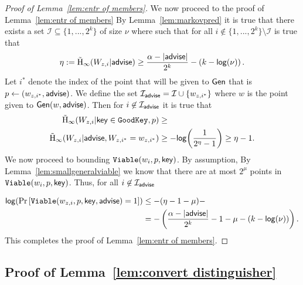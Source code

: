 \begin{proof}[Proof of Lemma~\ref{lem:entr of members}]
\noindent
We now proceed to the proof of Lemma~\ref{lem:entr of members}
By Lemma~\ref{lem:markovpred} it is true that there exists a set $\mathcal{I}\subseteq \{1,...,2^k\}$ of size $\nu$ where  such that for all $i\not \in \{1,...,2^k\} \setminus\mathcal{I}$ is true that 
\[
\eta:=\tilde{\mathrm{H}}_\infty(W_{z,i} | {\mathsf{advise}}) \ge \frac{\alpha -|{\mathsf{advise}}|}{2^k} -\left(k-\mathsf{log}\!\left(\nu\right)\right).
\]
Let $i^*$ denote the index of the point that will be given to ${\mathsf{Gen}}$ that is $p\leftarrow (w_{z,i^*}, {\mathsf{advise}})$.  We define the set $\mathcal{I}_{\mathsf{advise}} = \mathcal{I} \cup \{w_{z,i^*}\}$ where $w$ is the point given to ${\mathsf{Gen}}(w, {\mathsf{advise}})$.  
Then for $i\not\in \mathcal{I}_{{\mathsf{advise}}}$ it is true that 
\begin{align*}
\tilde{\mathrm{H}}_\infty(W_{z,i} | \mathsf{key} \in \mathtt{GoodKey}, p)&\ge \\
\tilde{\mathrm{H}}_\infty(W_{z,i} | {\mathsf{advise}}, W_{z,i^*}= w_{z,i^*}) &\ge -\mathsf{log}\!\left(\frac{1}{2^{\eta}-1}\right) \ge \eta-1.
\end{align*}
We now proceed to bounding $\mathtt{Viable}(w_i, p, \mathsf{key})$.  By assumption, By Lemma~\ref{lem:smallgeneralviable} we know that there are at most $2^\mu$ points in $\mathtt{Viable}(w_i, p, \mathsf{key})$.  Thus, for all $i\not \in\mathcal{I}_{{\mathsf{advise}}}$ 

\begin{align*}
\mathsf{log}\!\left(\Pr\left[\mathtt{Viable}(w_{z,i}, p, \mathsf{key}, {\mathsf{advise}}) = 1 \right]\right)&\le - (\eta-1 -\mu) - \\
&=-\left(\frac{\alpha -|{\mathsf{advise}}| }{2^k}-1-\mu-\left(k-\mathsf{log}\!\left(\nu\right)\right)\right).
\end{align*}
This completes the proof of Lemma~\ref{lem:entr of members}.
\end{proof}


\subsection{Proof of Lemma~\ref{lem:convert distinguisher}}

